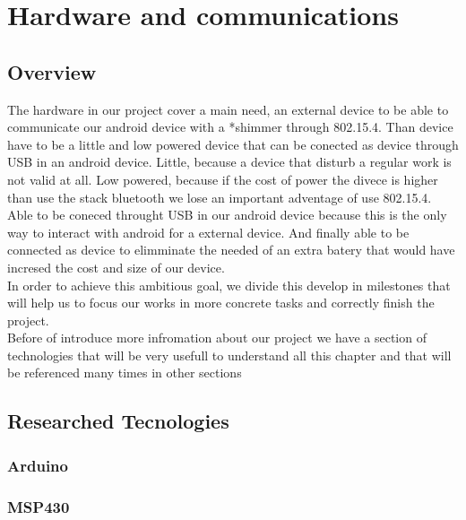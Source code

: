 \chapter{Hardware and communications}
\label{ch:hardware}
	\section{Overview}	
	The hardware in our project cover a main need, an external device to be able to communicate our android device with a *shimmer through 802.15.4. Than device have to be a little and low powered device that can be conected as device through USB in an android device. Little, because a device that disturb a regular work is not valid at all. Low powered, because if the cost of power the divece is higher than use the stack bluetooth we lose an important adventage of use 802.15.4. Able to be coneced throught USB in our android device because this is the only way to interact with android for a external device. And finally able to be connected as device to elimminate the needed of an extra batery that would have incresed the cost and size of our device. \\

	In order to achieve this ambitious goal, we divide this develop in milestones that will help us to focus our works in more concrete tasks and correctly finish the project. \\

	Before of introduce more infromation about our project we have a section of technologies that will be very usefull to understand all this chapter and that will be referenced many times in other sections

	\section{Researched Tecnologies}
		\subsection{Arduino}
		\subsection{MSP430}
